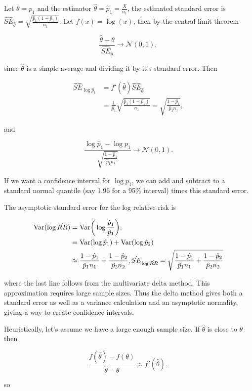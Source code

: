 \documentclass{homework}
\begin{document}
Let $\theta = p_1$ and the estimator $\hat{ \theta} = \hat{p}_1 = \frac{X}{n_1}$, the estimated standard error is $\hat{SE}_{\hat{\theta}} = \sqrt{\frac{\hat{p}_1(1-\hat{p}_1)}{n_1}}$. Let $f(x) = \log(x)$, then by the central limit theorem 

$$
\frac{\hat{\theta}-\theta}{\hat{SE}_{\hat{ \theta}}} \rightarrow \mathcal{N}(0,1),
$$

since $\hat{ \theta}$ is a simple average and dividing it by it's standard error. Then

\begin{align*}
\hat{SE}_{\log \hat{p}_1} &= f'(\hat{\theta}) \hat{SE}_{\hat{\theta}} \\
& = \frac{1}{\hat{p}_1} \sqrt{\frac{\hat{p}_1(1-\hat{p}_1)}{n_1}} = \sqrt{\frac{1-\hat{p}_1}{\hat{p}_1 n_1}},
\end{align*}

and 

$$
\frac{\log \hat{p}_1 - \log {p}_1}{\sqrt{\frac{1-\hat{p}_1}{\hat{p}_1 n_1}}} \rightarrow \mathcal{N}(0,1).
$$

If we want a confidence interval for $\log {p}_1$, we can add and subtract to a standard normal quantile (say 1.96 for a 95\% interval) times this standard error. 

The asymptotic standard error for the log relative risk is 

\begin{align}
\textnormal{Var}(\log \hat{RR}) &= \textnormal{Var}\bigg(\log\frac{\hat{p}_1}{\hat{p}_1}\bigg), \\
&= \textnormal{Var}(\log \hat{p}_1) + \textnormal{Var}(\log \hat{p}_2) \\
&\approx \frac{1-\hat{p}_1}{\hat{p}_1 n_1}+\frac{1-\hat{p}_2}{\hat{p}_2n_2},
\hat{SE}_{\log \hat{RR}} = \sqrt{\frac{1-\hat{p}_1}{\hat{p}_1 n_1}+\frac{1-\hat{p}_2}{\hat{p}_2n_2}}
\end{align}

where the last line follows from the multivariate delta method. This approximation requires large sample sizes. Thus the delta method gives both a standard error as well as a variance calculation and an asymptotic normality, giving a way to create confidence intervals. 

Heuristically, let's assume we have a large enough sample size. If $\hat{\theta}$ is close to $\theta$ then

$$
\frac{f(\hat{\theta})-f(\theta)}{\hat{\theta}-\theta} \approx f'(\hat{\theta}),
$$

so 
\end{document}
